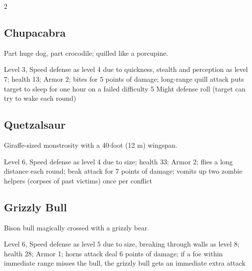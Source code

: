 \begin{multicols}{2}
\subsection{Chupacabra} Part huge dog, part crocodile; quilled like a porcupine. 

Level 3, Speed defense as level 4 due to quickness, stealth and perception as level 7; health 13; Armor 2; bites for 5 points of damage; long-range quill attack puts target to sleep for one hour on a failed difficulty 5 Might defense roll (target can try to wake each round) 

\subsection{Quetzalsaur} Giraffe-sized monstrosity with a 40-foot (12 m) wingspan. 

Level 6, Speed defense as level 4 due to size; health 33; Armor 2; flies a long distance each round; beak attack for 7 points of damage; vomits up two zombie helpers (corpses of past victims) once per conflict 

\subsection{Grizzly Bull} Bison bull magically crossed with a grizzly bear. 

Level 6, Speed defense as level 5 due to size, breaking through walls as level 8; health 28; Armor 1; horns attack deal 6 points of damage; if a foe within immediate range misses the bull, the grizzly bull gets an immediate extra attack 


\end{multicols}
